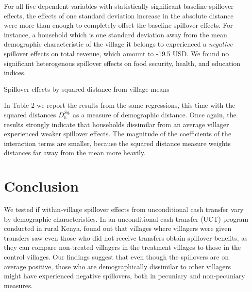 \documentclass[11pt]{article}
\begin{document}
For all five dependent variables with statistically significant baseline spillover effects, the effects of one standard deviation increase in the absolute distance were more than enough to completely offset the baseline spillover effects. For instance, a household which is one standard deviation away from the mean demographic characteristic of the village it belongs to experienced a \textit{negative} spillover effects on total revenue, which amount to -19.5 USD. We found no significant heterogenous spillover effects on food security, health, and education indices.  

\begin{table}[H]
\centering
\caption{Spillover effects by squared distance from village means}
\end{table}

In Table 2 we report the results from the same regressions, this time with the squared distances $D_n^{Sq.}$ as a measure of demographic distance. Once again, the results strongly indicate that households dissimilar from an average villager experienced weaker spillover effects. The magnitude of the coefficients of the interaction terms are smaller, because the squared distance measure weights distances far away from the mean more heavily. 

\section{Conclusion}
  We tested if within-village spillover effects from unconditional cash transfer vary by demographic characteristics. In an unconditional cash transfer (UCT) program conducted in rural Kenya, \textcite{haushofer_short-term_2016} found out that villages where villagers were given transfers saw even those who did not receive transfers obtain spillover benefits, as they can compare non-treated villagers in the treatment villages to those in the control villages. Our findings suggest that even though the spillovers are on average positive, those who are demographically dissimilar to other villagers might have experienced negative spillovers, both in pecuniary and non-pecuniary measures. 


\newpage

\printbibliography
\end{document}
